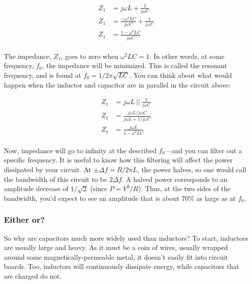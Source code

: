 \documentclass[12pt]{report}
\begin{document}
\begin{equation} \label{filt1}
\begin{split}
Z_1 &= j\omega L + \frac{1}{j\omega C} \\
Z_1 &= \frac{-\omega^2 LC}{j\omega C} + \frac{1}{j\omega C} \\
Z_1 &= \frac{1 -\omega^2 LC}{j\omega C}\\
\end{split}
\end{equation}

The impedance, $Z_1$, goes to zero when $\omega^2 LC = 1$. In other words, at some frequency, $f_0$, the impedance will be minimized. This is called the resonant frequency, and is found at $f_0 = 1/2\pi \sqrt{LC}$. You can think about what would happen when the inductor and capacitor are in parallel in the circuit above:

\begin{equation} \label{filt1}
\begin{split}
Z_1 &= j\omega L \: || \: \frac{1}{j\omega C} \\
Z_1 &= \frac{j\omega L/j\omega C}{j\omega L + 1/j\omega C} \\
Z_1 &= \frac{j\omega L}{1-\omega^2 LC} \\
\end{split}
\end{equation}

Now, impedance will go to infinity at the described $f_0$---and you can filter out a specific frequency. It is useful to know how this filtering will affect the power dissipated by your circuit. At $\pm \Delta f = R/2\pi L$, the power halves, so one would call the bandwidth of this circuit to be $2\Delta f$. A halved power corresponds to an amplitude decrease of $1/\sqrt{2}$ (since $P = V^2/R$). Thus, at the two sides of the bandwidth, you'd expect to see an amplitude that is about $70\%$ as large as at $f_0$. 

\subsubsection{Either or?}
So why are capacitors much more widely used than inductors? To start, inductors are usually large and heavy. As it must be a coin of wires, usually wrapped around some magnetically-permeable metal, it doesn't easily fit into circuit boards. Too, inductors will continuously dissipate energy, while capacitors that are charged do not.\newline
\end{document}
